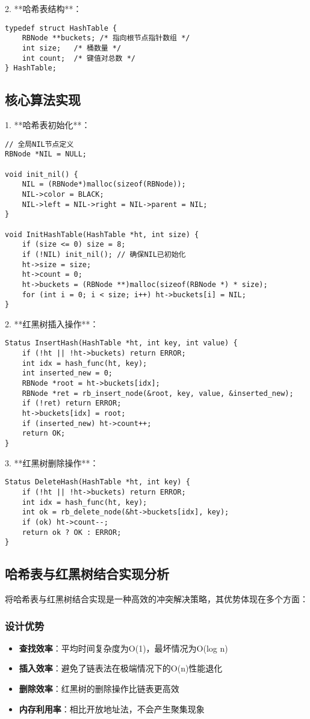 \documentclass[12pt,a4paper]{article}
\begin{document}
2. **哈希表结构**：
\begin{lstlisting}
typedef struct HashTable {
    RBNode **buckets; /* 指向根节点指针数组 */
    int size;   /* 桶数量 */
    int count;  /* 键值对总数 */
} HashTable;
\end{lstlisting}

\subsection{核心算法实现}
1. **哈希表初始化**：
\begin{lstlisting}
// 全局NIL节点定义
RBNode *NIL = NULL;

void init_nil() {
    NIL = (RBNode*)malloc(sizeof(RBNode));
    NIL->color = BLACK;
    NIL->left = NIL->right = NIL->parent = NIL;
}

void InitHashTable(HashTable *ht, int size) {
    if (size <= 0) size = 8;
    if (!NIL) init_nil(); // 确保NIL已初始化
    ht->size = size;
    ht->count = 0;
    ht->buckets = (RBNode **)malloc(sizeof(RBNode *) * size);
    for (int i = 0; i < size; i++) ht->buckets[i] = NIL;
}
\end{lstlisting}

2. **红黑树插入操作**：
\begin{lstlisting}
Status InsertHash(HashTable *ht, int key, int value) {
    if (!ht || !ht->buckets) return ERROR;
    int idx = hash_func(ht, key);
    int inserted_new = 0;
    RBNode *root = ht->buckets[idx];
    RBNode *ret = rb_insert_node(&root, key, value, &inserted_new);
    if (!ret) return ERROR;
    ht->buckets[idx] = root;
    if (inserted_new) ht->count++;
    return OK;
}
\end{lstlisting}

3. **红黑树删除操作**：
\begin{lstlisting}
Status DeleteHash(HashTable *ht, int key) {
    if (!ht || !ht->buckets) return ERROR;
    int idx = hash_func(ht, key);
    int ok = rb_delete_node(&ht->buckets[idx], key);
    if (ok) ht->count--;
    return ok ? OK : ERROR;
}
\end{lstlisting}

\subsection{哈希表与红黑树结合实现分析}
将哈希表与红黑树结合实现是一种高效的冲突解决策略，其优势体现在多个方面：

\subsubsection{设计优势}
\begin{itemize}
\item \textbf{查找效率}：平均时间复杂度为O(1)，最坏情况为O(log n)
\item \textbf{插入效率}：避免了链表法在极端情况下的O(n)性能退化
\item \textbf{删除效率}：红黑树的删除操作比链表更高效
\item \textbf{内存利用率}：相比开放地址法，不会产生聚集现象
\end{itemize}
\end{document}
